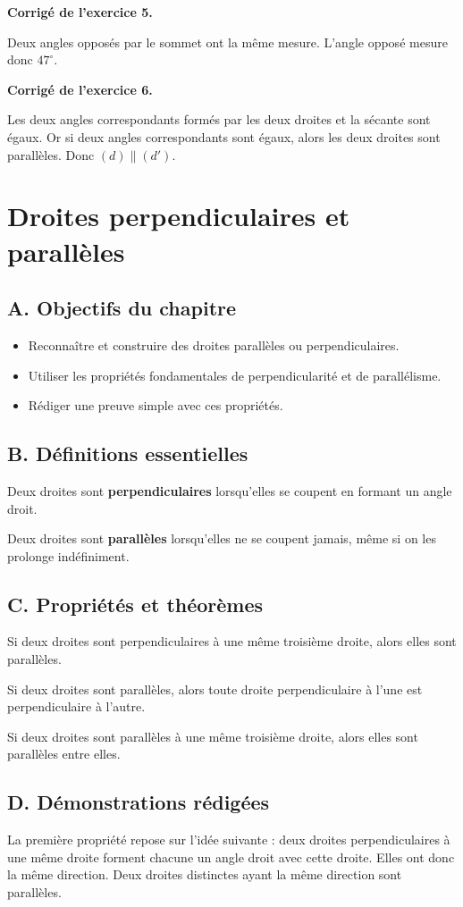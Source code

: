\documentclass[11pt,a4paper]{article}
\newcounter{exercice}
\newenvironment{corrige}[1][]
{\par\medskip\noindent\textbf{Corrigé de l'exercice #1.}\par\smallskip}
{\medskip}
\newcommand{\chapitre}[1]{
\clearpage
\section{#1}
}
\newcommand{\objectif}[1]{\subsection*{A. Objectifs du chapitre}#1}
\newcommand{\defs}{\subsection*{B. Définitions essentielles}}
\newcommand{\props}{\subsection*{C. Propriétés et théorèmes}}
\newcommand{\demos}{\subsection*{D. Démonstrations rédigées}}
\begin{document}
\begin{corrige}[5]
Deux angles opposés par le sommet ont la même mesure. L'angle opposé mesure donc $47^\circ$.
\end{corrige}

\begin{corrige}[6]
Les deux angles correspondants formés par les deux droites et la sécante sont égaux. Or si deux angles correspondants sont égaux, alors les deux droites sont parallèles. Donc $(d)\parallel(d')$.
\end{corrige}

\chapitre{Droites perpendiculaires et parallèles}

\objectif{
\begin{itemize}
\item Reconnaître et construire des droites parallèles ou perpendiculaires.
\item Utiliser les propriétés fondamentales de perpendicularité et de parallélisme.
\item Rédiger une preuve simple avec ces propriétés.
\end{itemize}}

\defs
\begin{definitionbox}
Deux droites sont \textbf{perpendiculaires} lorsqu'elles se coupent en formant un angle droit.

Deux droites sont \textbf{parallèles} lorsqu'elles ne se coupent jamais, même si on les prolonge indéfiniment.
\end{definitionbox}

\props
\begin{proprietebox}
Si deux droites sont perpendiculaires à une même troisième droite, alors elles sont parallèles.
\end{proprietebox}

\begin{proprietebox}
Si deux droites sont parallèles, alors toute droite perpendiculaire à l'une est perpendiculaire à l'autre.
\end{proprietebox}

\begin{proprietebox}
Si deux droites sont parallèles à une même troisième droite, alors elles sont parallèles entre elles.
\end{proprietebox}

\demos
\begin{preuvebox}
La première propriété repose sur l'idée suivante : deux droites perpendiculaires à une même droite forment chacune un angle droit avec cette droite. Elles ont donc la même direction. Deux droites distinctes ayant la même direction sont parallèles.
\end{preuvebox}
\end{document}
